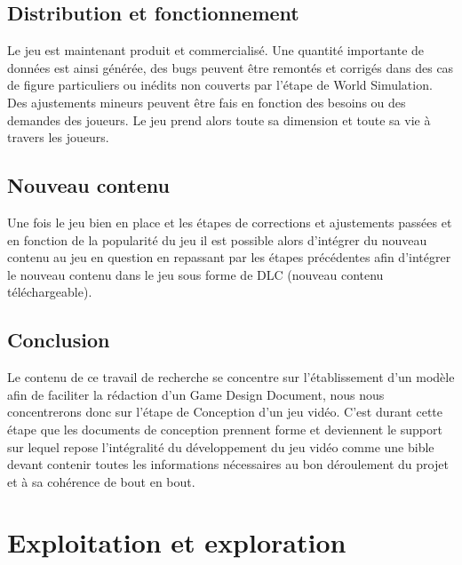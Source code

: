 \subsection{Distribution et fonctionnement}
Le jeu est maintenant produit et commercialisé. Une quantité importante de données est ainsi générée, des bugs peuvent être remontés et corrigés dans des cas de figure particuliers ou inédits non couverts par l'étape de World Simulation. Des ajustements mineurs peuvent être fais en fonction des besoins ou des demandes des joueurs. Le jeu prend alors toute sa dimension et toute sa vie à travers les joueurs.

\subsection{Nouveau contenu}
Une fois le jeu bien en place et les étapes de corrections et ajustements passées et en fonction de la popularité du jeu il est possible alors d'intégrer du nouveau contenu au jeu en question en repassant par les étapes précédentes afin d'intégrer le nouveau contenu dans le jeu sous forme de DLC (nouveau contenu téléchargeable).

\subsection{Conclusion}
Le contenu de ce travail de recherche se concentre sur l'établissement d'un modèle afin de faciliter la rédaction d'un Game Design Document, nous nous concentrerons donc sur l'étape de Conception d'un jeu vidéo. C'est durant cette étape que les documents de conception prennent forme et deviennent le support sur lequel repose l'intégralité du développement du jeu vidéo comme une bible devant contenir toutes les informations nécessaires au bon déroulement du projet et à sa cohérence de bout en bout.



\section{Exploitation et exploration}
